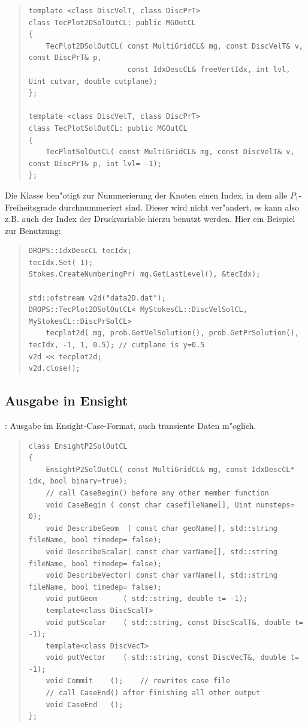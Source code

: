 \documentclass[11pt,a4paper]{article}
\newenvironment{Code}{\begin{quote}\scriptsize}{\end{quote}}
\begin{document}
\begin{Code}
\begin{verbatim}
template <class DiscVelT, class DiscPrT>
class TecPlot2DSolOutCL: public MGOutCL
{
    TecPlot2DSolOutCL( const MultiGridCL& mg, const DiscVelT& v, const DiscPrT& p, 
                       const IdxDescCL& freeVertIdx, int lvl, Uint cutvar, double cutplane);
};

template <class DiscVelT, class DiscPrT>
class TecPlotSolOutCL: public MGOutCL
{
    TecPlotSolOutCL( const MultiGridCL& mg, const DiscVelT& v, const DiscPrT& p, int lvl= -1);
};
\end{verbatim}
\end{Code}
Die Klasse  ben"otigt zur Nummerierung der Knoten einen 
Index, in dem alle $P_1$-Freiheitsgrade durchnummeriert sind. Dieser wird nicht
ver"andert, es kann also z.B. auch der Index der Druckvariable hierzu benutzt
werden. Hier ein Beispiel zur Benutzung:
\begin{Code}
\begin{verbatim}
DROPS::IdxDescCL tecIdx;
tecIdx.Set( 1);
Stokes.CreateNumberingPr( mg.GetLastLevel(), &tecIdx);    

std::ofstream v2d("data2D.dat");
DROPS::TecPlot2DSolOutCL< MyStokesCL::DiscVelSolCL, MyStokesCL::DiscPrSolCL>
    tecplot2d( mg, prob.GetVelSolution(), prob.GetPrSolution(), tecIdx, -1, 1, 0.5); // cutplane is y=0.5
v2d << tecplot2d;
v2d.close();
\end{verbatim}
\end{Code}

\subsection{Ausgabe in Ensight}
: Ausgabe im Ensight-Case-Format, auch transiente Daten
m"oglich.
\begin{Code}
\begin{verbatim}
class EnsightP2SolOutCL
{
    EnsightP2SolOutCL( const MultiGridCL& mg, const IdxDescCL* idx, bool binary=true);
    // call CaseBegin() before any other member function
    void CaseBegin ( const char casefileName[], Uint numsteps= 0);
    void DescribeGeom  ( const char geoName[], std::string fileName, bool timedep= false);
    void DescribeScalar( const char varName[], std::string fileName, bool timedep= false);
    void DescribeVector( const char varName[], std::string fileName, bool timedep= false);
    void putGeom      ( std::string, double t= -1);
    template<class DiscScalT>
    void putScalar    ( std::string, const DiscScalT&, double t= -1);
    template<class DiscVecT>
    void putVector    ( std::string, const DiscVecT&, double t= -1);
    void Commit    ();    // rewrites case file
    // call CaseEnd() after finishing all other output
    void CaseEnd   ();
};
\end{verbatim}
\end{Code}
\end{document}
